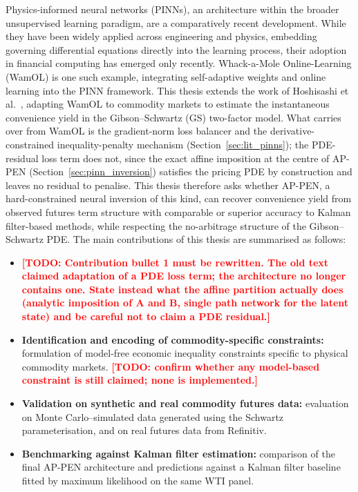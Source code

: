 \documentclass[11pt, a4paper]{article}
\newcommand{\todo}[1]{\textcolor{red}{\textbf{[TODO: #1]}}}
\begin{document}
Physics-informed neural networks (PINNs), an architecture within the broader unsupervised learning paradigm, are a comparatively recent development. While they have been widely applied across engineering and physics, embedding governing differential equations directly into the learning process, their adoption in financial computing has emerged only recently. Whack-a-Mole Online-Learning (WamOL) is one such example, integrating self-adaptive weights and online learning into the PINN framework. This thesis extends the work of Hoshisashi et al.~\cite{Hoshisashi2024Whack-a-moleSurface}, adapting WamOL to commodity markets to estimate the instantaneous convenience yield in the Gibson–Schwartz (GS) two-factor model. What carries over from WamOL is the gradient-norm loss balancer and the derivative-constrained inequality-penalty mechanism (Section~\ref{sec:lit_pinns}); the PDE-residual loss term does not, since the exact affine imposition at the centre of AP-PEN (Section~\ref{sec:pinn_inversion}) satisfies the pricing PDE by construction and leaves no residual to penalise.
This thesis therefore asks whether AP-PEN, a hard-constrained neural inversion of this kind, can recover convenience yield from observed futures term structure with comparable or superior accuracy to Kalman filter-based methods, while respecting the no-arbitrage structure of the Gibson–Schwartz PDE. The main contributions of this thesis are summarised as follows:

\begin{itemize}
    \item \todo{Contribution bullet 1 must be rewritten. The old text claimed
      adaptation of a PDE loss term; the architecture no longer contains one.
      State instead what the affine partition actually does (analytic imposition
      of A and B, single path network for the latent state) and be careful not to
      claim a PDE residual.}
    \item \textbf{Identification and encoding of commodity-specific constraints:} formulation of model-free economic inequality constraints specific to physical commodity markets. \todo{confirm whether any model-based constraint is still claimed; none is implemented.}
    \item \textbf{Validation on synthetic and real commodity futures data:} evaluation on Monte Carlo–simulated data generated using the Schwartz~\cite{Schwartz1997TheHedging} parameterisation, and on real futures data from Refinitiv.
    \item \textbf{Benchmarking against Kalman filter estimation:} comparison of the final AP-PEN architecture and predictions against a Kalman filter baseline fitted by maximum likelihood on the same WTI panel.
\end{itemize}
\end{document}
